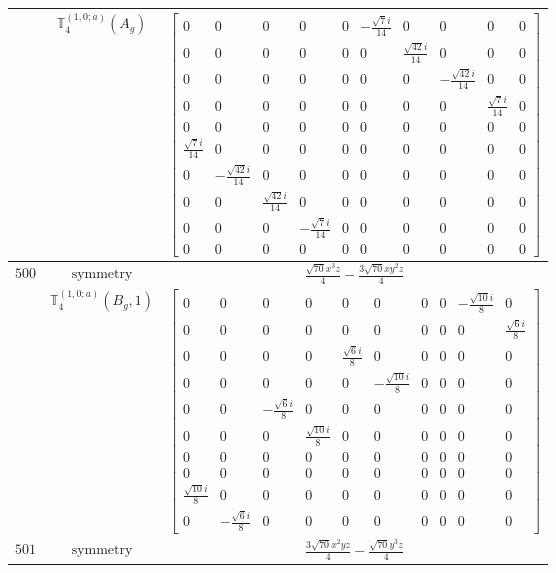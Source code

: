 \documentclass[fleqn,8pt,landscape]{jsarticle}
\begin{document}
\begin{longtable}{ccc}
$  $ & $ \mathbb{T}_{4}^{(1,0;a)}(A_{g}) $ & $ \begin{bmatrix} 0 & 0 & 0 & 0 & 0 & - \frac{\sqrt{7} i}{14} & 0 & 0 & 0 & 0 \\ 0 & 0 & 0 & 0 & 0 & 0 & \frac{\sqrt{42} i}{14} & 0 & 0 & 0 \\ 0 & 0 & 0 & 0 & 0 & 0 & 0 & - \frac{\sqrt{42} i}{14} & 0 & 0 \\ 0 & 0 & 0 & 0 & 0 & 0 & 0 & 0 & \frac{\sqrt{7} i}{14} & 0 \\ 0 & 0 & 0 & 0 & 0 & 0 & 0 & 0 & 0 & 0 \\ \frac{\sqrt{7} i}{14} & 0 & 0 & 0 & 0 & 0 & 0 & 0 & 0 & 0 \\ 0 & - \frac{\sqrt{42} i}{14} & 0 & 0 & 0 & 0 & 0 & 0 & 0 & 0 \\ 0 & 0 & \frac{\sqrt{42} i}{14} & 0 & 0 & 0 & 0 & 0 & 0 & 0 \\ 0 & 0 & 0 & - \frac{\sqrt{7} i}{14} & 0 & 0 & 0 & 0 & 0 & 0 \\ 0 & 0 & 0 & 0 & 0 & 0 & 0 & 0 & 0 & 0 \end{bmatrix} $ \\ \hline
$ 500 $ & $ \text{symmetry} $ & $ \frac{\sqrt{70} x^{3} z}{4} - \frac{3 \sqrt{70} x y^{2} z}{4} $ \\
$  $ & $ \mathbb{T}_{4}^{(1,0;a)}(B_{g},1) $ & $ \begin{bmatrix} 0 & 0 & 0 & 0 & 0 & 0 & 0 & 0 & - \frac{\sqrt{10} i}{8} & 0 \\ 0 & 0 & 0 & 0 & 0 & 0 & 0 & 0 & 0 & \frac{\sqrt{6} i}{8} \\ 0 & 0 & 0 & 0 & \frac{\sqrt{6} i}{8} & 0 & 0 & 0 & 0 & 0 \\ 0 & 0 & 0 & 0 & 0 & - \frac{\sqrt{10} i}{8} & 0 & 0 & 0 & 0 \\ 0 & 0 & - \frac{\sqrt{6} i}{8} & 0 & 0 & 0 & 0 & 0 & 0 & 0 \\ 0 & 0 & 0 & \frac{\sqrt{10} i}{8} & 0 & 0 & 0 & 0 & 0 & 0 \\ 0 & 0 & 0 & 0 & 0 & 0 & 0 & 0 & 0 & 0 \\ 0 & 0 & 0 & 0 & 0 & 0 & 0 & 0 & 0 & 0 \\ \frac{\sqrt{10} i}{8} & 0 & 0 & 0 & 0 & 0 & 0 & 0 & 0 & 0 \\ 0 & - \frac{\sqrt{6} i}{8} & 0 & 0 & 0 & 0 & 0 & 0 & 0 & 0 \end{bmatrix} $ \\ \hline
$ 501 $ & $ \text{symmetry} $ & $ \frac{3 \sqrt{70} x^{2} y z}{4} - \frac{\sqrt{70} y^{3} z}{4} $ \\

\end{longtable}
\end{document}
